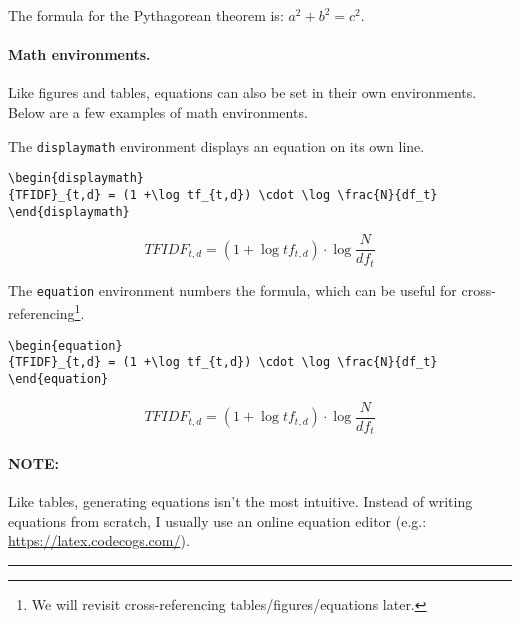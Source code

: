 \documentclass[11pt]{article}
\begin{document}
The formula for the Pythagorean theorem is: $a^{2} + b^{2} = c^{2}$.

\paragraph{Math environments.} Like figures and tables, equations can also be set in their own environments. Below are a few examples of math environments.

\noindent The \verb|displaymath| environment displays an equation on its own line.
\begin{lstlisting}
\begin{displaymath}
{TFIDF}_{t,d} = (1 +\log tf_{t,d}) \cdot \log \frac{N}{df_t}
\end{displaymath}
\end{lstlisting}

\begin{displaymath}
{TFIDF}_{t,d} = (1 +\log tf_{t,d}) \cdot \log \frac{N}{df_t}
\end{displaymath}

\noindent The \verb|equation| environment numbers the formula, which can be useful for cross-referencing\footnote{We will revisit cross-referencing tables/figures/equations later.}.

\begin{lstlisting}
\begin{equation}
{TFIDF}_{t,d} = (1 +\log tf_{t,d}) \cdot \log \frac{N}{df_t}
\end{equation}
\end{lstlisting}

\begin{equation}
{TFIDF}_{t,d} = (1 +\log tf_{t,d}) \cdot \log \frac{N}{df_t}
\end{equation}

\paragraph{NOTE:} Like tables, generating equations isn't the most intuitive. Instead of writing equations from scratch, I usually use an online equation editor (e.g.: \url{https://latex.codecogs.com/}).

\newpage
\hrule
\end{document}
